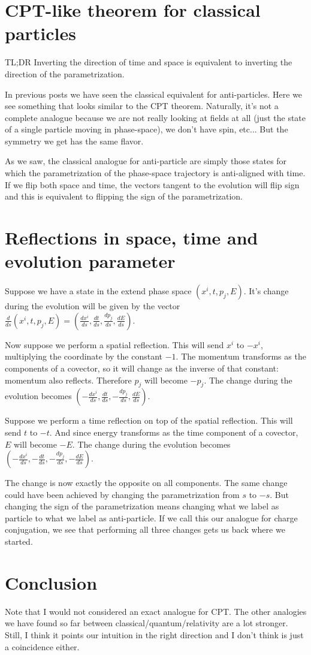 \documentclass[aps,pra,10pt,floatfix,nofootinbib]{revtex4-1}
\theoremstyle{definition}
\begin{document}
\section{CPT-like theorem for classical particles}

TL;DR Inverting the direction of time and space is equivalent to inverting the direction of the parametrization.

In previous posts we have seen the classical equivalent for anti-particles. Here we see something that looks similar to the CPT theorem. Naturally, it's not a complete analogue because we are not really looking at fields at all (just the state of a single particle moving in phase-space), we don't have spin, etc... But the symmetry we get has the same flavor.

As we saw, the classical analogue for anti-particle are simply those states for which the parametrization of the phase-space trajectory is anti-aligned with time. If we flip both space and time, the vectors tangent to the evolution will flip sign and this is equivalent to flipping the sign of the parametrization.

\section{Reflections in space, time and evolution parameter}

Suppose we have a state in the extend phase space $(x^i,t,p_j,E)$. It's change during the evolution will be given by the vector $\frac{d}{ds}(x^i,t,p_j,E) = (\frac{dx^i}{ds},\frac{dt}{ds},\frac{dp_j}{ds},\frac{dE}{ds})$.

Now suppose we perform a spatial reflection. This will send $x^i$ to $-x^i$, multiplying the coordinate by the constant $-1$. The momentum transforms as the components of a covector, so it will change as the inverse of that constant: momentum also reflects. Therefore $p_j$ will become $-p_j$. The change during the evolution becomes $(-\frac{dx^i}{ds},\frac{dt}{ds},-\frac{dp_j}{ds},\frac{dE}{ds})$.

Suppose we perform a time reflection on top of the spatial reflection. This will send $t$ to $-t$. And since energy transforms as the time component of a covector, $E$ will become $-E$. The change during the evolution becomes $(-\frac{dx^i}{ds},-\frac{dt}{ds},-\frac{dp_j}{ds},-\frac{dE}{ds})$.

The change is now exactly the opposite on all components. The same change could have been achieved by changing the parametrization from $s$ to $-s$. But changing the sign of the parametrization means changing what we label as particle to what we label as anti-particle. If we call this our analogue for charge conjugation, we see that performing all three changes gets us back where we started.


\section{Conclusion}

Note that I would not considered an exact analogue for CPT. The other analogies we have found so far between classical/quantum/relativity are a lot stronger. Still, I think it points our intuition in the right direction and I don't think is just a coincidence either.
\end{document}
